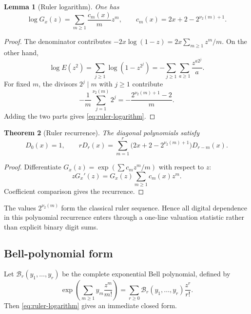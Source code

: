 \documentclass[11pt,oneside]{article}
\numberwithin{equation}{section}
\newtheorem{theorem}{Theorem}[section]
\newtheorem{lemma}[theorem]{Lemma}
\theoremstyle{definition}
\theoremstyle{remark}
\newcommand{\nuTwo}{\nu_2}
\newcommand{\Diag}{D}
\newcommand{\Bell}{\mathcal B}
\begin{document}
\begin{lemma}[Ruler logarithm]
One has
\begin{equation}
 \boxed{
 \log G_x(z)=\sum_{m\ge1}
 \frac{c_m(x)}{m}z^m,
 \qquad
 c_m(x)=2x+2-2^{\nuTwo(m)+1}.}
 \label{eq:ruler-logarithm}
\end{equation}
\end{lemma}

\begin{proof}
The denominator contributes
\(-2x\log(1-z)=2x\sum_{m\ge1}z^m/m\).  On the other hand,
\[
 \log E(z^2)
 =\sum_{j\ge1}\log(1-z^{2^j})
 =-\sum_{j\ge1}\sum_{a\ge1}\frac{z^{a2^j}}a.
\]
For fixed \(m\), the divisors \(2^j\mid m\) with \(j\ge1\) contribute
\[
 -\frac1m\sum_{j=1}^{\nuTwo(m)}2^j
 =-\frac{2^{\nuTwo(m)+1}-2}{m}.
\]
Adding the two parts gives \eqref{eq:ruler-logarithm}.
\end{proof}

\begin{theorem}[Ruler recurrence]
The diagonal polynomials satisfy
\begin{equation}
 \boxed{
 \Diag_0(x)=1,
 \qquad
 r\Diag_r(x)=\sum_{m=1}^{r}
 \bigl(2x+2-2^{\nuTwo(m)+1}\bigr)\Diag_{r-m}(x).}
 \label{eq:ruler-recurrence}
\end{equation}
\end{theorem}

\begin{proof}
Differentiate \(G_x(z)=\exp(\sum c_mz^m/m)\) with respect to \(z\):
\[
 zG_x'(z)=G_x(z)\sum_{m\ge1}c_m(x)z^m.
\]
Coefficient comparison gives the recurrence.
\end{proof}

The values \(2^{\nuTwo(m)}\) form the classical ruler sequence.  Hence all
digital dependence in this polynomial recurrence enters through a one-line
valuation statistic rather than explicit binary digit sums.

\subsection{Bell-polynomial form}

Let \(\Bell_r(y_1,\ldots,y_r)\) be the complete exponential Bell polynomial,
defined by
\begin{equation}
 \exp\left(\sum_{m\ge1}y_m\frac{z^m}{m!}\right)
 =\sum_{r\ge0}\Bell_r(y_1,\ldots,y_r)\frac{z^r}{r!}.
 \label{eq:Bell-definition}
\end{equation}
Then \eqref{eq:ruler-logarithm} gives an immediate closed form.
\end{document}
